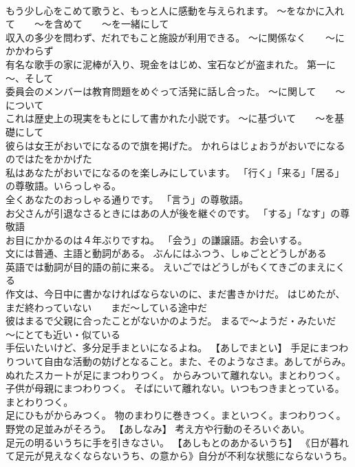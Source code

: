 \documentclass[8pt]{extreport}
\begin{document}
\begin{CJK}{UTF8}{min}
\\	もう少し心をこめて歌うと、もっと人に感動を与えられます。	～をなかに入れて　　～を含めて　　～を一緒にして
\\	収入の多少を問わず、だれでもこと施設が利用できる。	～に関係なく　　～にかかわらず
\\	有名な歌手の家に泥棒が入り、現金をはじめ、宝石などが盗まれた。	第一に～、そして
\\	委員会のメンバーは教育問題をめぐって活発に話し合った。	～に関して　　～について
\\	これは歴史上の現実をもとにして書かれた小説です。	～に基づいて　　～を基礎にして
\\	彼らは女王がおいでになるので旗を掲げた。	かれらはじょおうがおいでになるのではたをかかげた 
\\	私はあなたがおいでになるのを楽しみにしています。	「行く」「来る」「居る」の尊敬語。いらっしゃる。
\\	全くあなたのおっしゃる通りです。	「言う」の尊敬語。
\\	お父さんが引退なさるときにはあの人が後を継ぐのです。	「する」「なす」の尊敬語
\\	お目にかかるのは４年ぶりですね。	「会う」の謙譲語。お会いする。
\\	文には普通、主語と動詞がある。	ぶんにはふつう、しゅごとどうしがある 
\\	英語では動詞が目的語の前に来る。	えいごではどうしがもくてきごのまえにくる 
\\	作文は、今日中に書かなければならないのに、まだ書きかけだ。	はじめたが、まだ終わっていない　　まだ～している途中だ
\\	彼はまるで父親に合ったことがないかのようだ。	まるで～ようだ・みたいだ　　～にとても近い・似ている
\\	手伝いたいけど、多分足手まといになるよね。	【あしでまとい】 手足にまつわりついて自由な活動の妨げとなること。また、そのようなさま。あしてがらみ。
\\	ぬれたスカートが足にまつわりつく。	からみついて離れない。まとわりつく。
\\	子供が母親にまつわりつく。	そばにいて離れない。いつもつきまとっている。まとわりつく。
\\	足にひもがからみつく。	物のまわりに巻きつく。まといつく。まつわりつく。
\\	野党の足並みがそろう。	【あしなみ】 考え方や行動のそろいぐあい。
\\	足元の明るいうちに手を引きなさい。	【あしもとのあかるいうち】 《日が暮れて足元が見えなくならないうち、の意から》自分が不利な状態にならないうち。

\end{CJK}
\end{document}
